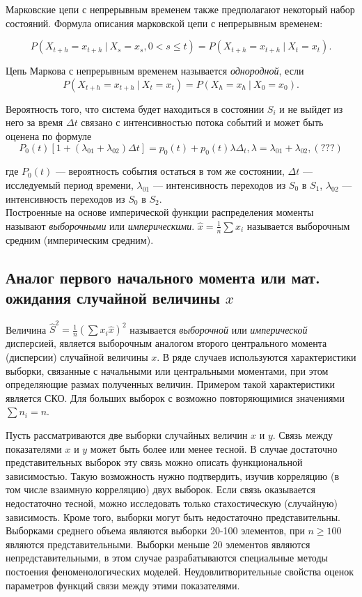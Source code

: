 \documentclass[12pt]{article}
\begin{document}
Марковские цепи с непрерывным временем также предполагают некоторый набор состояний. Формула описания марковской цепи с непрерывным временем:

\[ P(X_{t + h} = x_{t + h} ~|~ X_s = x_s, 0 < s \leq t) = P(X_{t + h} = x_{t + h} ~|~ X_t = x_t). \]

Цепь Маркова с непрерывным временем называется \emph{однородной}, если
\[ P(X_{t + h} = x_{t + h} ~|~ X_t = x_t) = P(X_h = x_h ~|~ X_0 = x_0). \]

Вероятность того, что система будет находиться в состоянии $S_i$ и не выйдет из него за время $\Delta t$ связано с интенсивностью потока событий и может быть оценена по формуле
\[ P_0(t) \left[1 + (\lambda_{01} + \lambda_{02}) \Delta t \right] = p_0(t) + p_0(t) \lambda \Delta_t, \lambda = \lambda_{01} + \lambda_{02}, (???)\] 

где $P_0(t)$ --- вероятность события остаться в том же состоянии, $\Delta t$ --- исследуемый период времени, $\lambda_{01}$ --- интенсивность переходов из $S_0$ в $S_1$, $\lambda_{02}$ --- интенсивность переходов из $S_0$ в $S_2$.\\

Построенные на основе имперической функции распределения моменты называют \emph{выборочными} или \emph{империческими}. $\hat{x} = \frac{1}{n} \sum x_i$ называется выборочным средним (империческим средним). 


\subsection{Аналог первого начального момента или мат. ожидания случайной величины $x$}

Величина $\hat{S}^2 = \frac{1}{n} (\sum x_i \hat{x})^2$ называется \emph{выборочной} или \emph{имперической} дисперсией, является выборочным аналогом второго центрального момента (дисперсии) случайной величины $x$. В ряде случаев используются характеристики выборки, связанные с начальными или центральными моментами, при этом определяющие размах полученных величин. Примером такой характеристики является СКО. Для больших выборок с возможно повторяющимися значениями $\sum n_i = n$.
 
Пусть рассматриваются две выборки случайных величин $x$ и $y$. Связь между показателями $x$ и $y$ может быть более или менее тесной. В случае достаточно представительных выборок эту связь можно описать функциональной зависимостью. Такую возможность нужно подтвердить, изучив корреляцию (в том числе взаимную корреляцию) двух выборок. Если связь оказывается недостаточно тесной, можно исследовать только стахостическую (случайную) зависимость. Кроме того, выборки могут быть недостаточно представительны. Выборками среднего объема являются выборки 20-100 элементов, при $n \geq 100$ являются представительными. Выборки меньше 20 элементов являются непредставительными, в этом случае разрабатываются специальные методы постоения феноменологических моделей. Неудовлитворительные свойства оценок параметров функций связи между этими показателями. 
\end{document}
